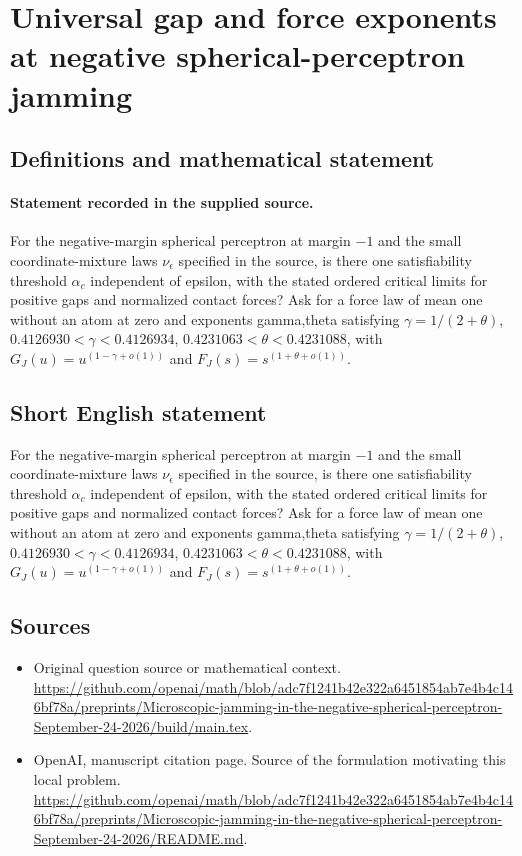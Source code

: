 \documentclass[11pt]{article}
\begin{document}
\section*{Universal gap and force exponents at negative spherical-perceptron jamming}\label{30007375}
\subsection{Definitions and mathematical statement}
\paragraph{Statement recorded in the supplied source.}
For the negative-margin spherical perceptron at margin $-1$ and the small coordinate-mixture laws $\nu _\epsilon $ specified in the source, is there one satisfiability threshold $\alpha _c$ independent of epsilon, with the stated ordered critical limits for positive gaps and normalized contact forces? Ask for a force law of mean one without an atom at zero and exponents gamma,theta satisfying $\gamma =1/(2+\theta )$, $0.4126930<\gamma <0.4126934$, $0.4231063<\theta <0.4231088$, with $G_J(u)=u^(1-\gamma +o(1))$ and $F_J(s)=s^(1+\theta +o(1))$.
\subsection{Short English statement}
For the negative-margin spherical perceptron at margin $-1$ and the small coordinate-mixture laws $\nu _\epsilon $ specified in the source, is there one satisfiability threshold $\alpha _c$ independent of epsilon, with the stated ordered critical limits for positive gaps and normalized contact forces? Ask for a force law of mean one without an atom at zero and exponents gamma,theta satisfying $\gamma =1/(2+\theta )$, $0.4126930<\gamma <0.4126934$, $0.4231063<\theta <0.4231088$, with $G_J(u)=u^(1-\gamma +o(1))$ and $F_J(s)=s^(1+\theta +o(1))$.
\subsection{Sources}
\begin{itemize}
\item[S1] Original question source or mathematical context.
\url{https://github.com/openai/math/blob/adc7f1241b42e322a6451854ab7e4b4c146bf78a/preprints/Microscopic-jamming-in-the-negative-spherical-perceptron-September-24-2026/build/main.tex}.
\item[S2] OpenAI, manuscript citation page. Source of the formulation motivating this local problem.
\url{https://github.com/openai/math/blob/adc7f1241b42e322a6451854ab7e4b4c146bf78a/preprints/Microscopic-jamming-in-the-negative-spherical-perceptron-September-24-2026/README.md}.
\end{itemize}
\end{document}
